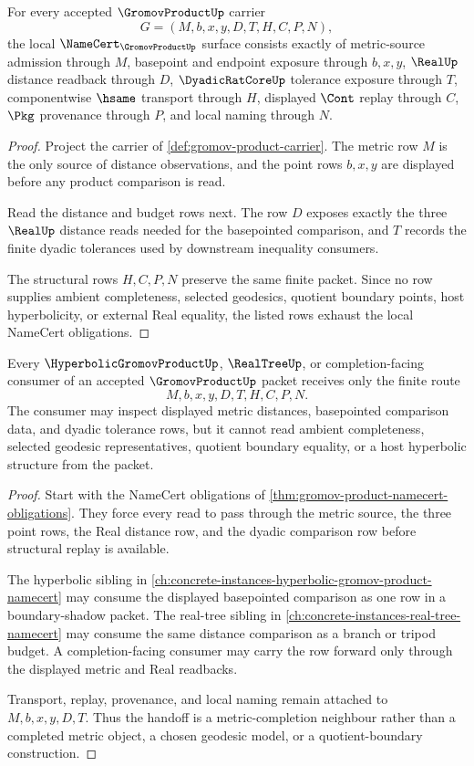\begin{theorem}
\label{thm:gromov-product-namecert-obligations}
For every accepted $\GromovProductUp$ carrier
$$
G=(M,b,x,y,D,T,H,C,P,N),
$$
the local $\NameCert_{\GromovProductUp}$ surface consists exactly of metric-source admission through $M$, basepoint and endpoint exposure through $b,x,y$, $\RealUp$ distance readback through $D$, $\DyadicRatCoreUp$ tolerance exposure through $T$, componentwise $\hsame$ transport through $H$, displayed $\Cont$ replay through $C$, $\Pkg$ provenance through $P$, and local naming through $N$.
\end{theorem}
\begin{proof}
Project the carrier of \autoref{def:gromov-product-carrier}. The metric row $M$ is the only source of distance observations, and the point rows $b,x,y$ are displayed before any product comparison is read.

Read the distance and budget rows next. The row $D$ exposes exactly the three $\RealUp$ distance reads needed for the basepointed comparison, and $T$ records the finite dyadic tolerances used by downstream inequality consumers.

The structural rows $H,C,P,N$ preserve the same finite packet. Since no row supplies ambient completeness, selected geodesics, quotient boundary points, host hyperbolicity, or external Real equality, the listed rows exhaust the local NameCert obligations.
\end{proof}

\begin{theorem}
\label{thm:gromov-product-metric-completion-handoff}
Every $\HyperbolicGromovProductUp$, $\RealTreeUp$, or completion-facing consumer of an accepted $\GromovProductUp$ packet receives only the finite route
$$
M,b,x,y,D,T,H,C,P,N .
$$
The consumer may inspect displayed metric distances, basepointed comparison data, and dyadic tolerance rows, but it cannot read ambient completeness, selected geodesic representatives, quotient boundary equality, or a host hyperbolic structure from the packet.
\end{theorem}
\begin{proof}
Start with the NameCert obligations of \autoref{thm:gromov-product-namecert-obligations}. They force every read to pass through the metric source, the three point rows, the Real distance row, and the dyadic comparison row before structural replay is available.

The hyperbolic sibling in \autoref{ch:concrete-instances-hyperbolic-gromov-product-namecert} may consume the displayed basepointed comparison as one row in a boundary-shadow packet. The real-tree sibling in \autoref{ch:concrete-instances-real-tree-namecert} may consume the same distance comparison as a branch or tripod budget. A completion-facing consumer may carry the row forward only through the displayed metric and Real readbacks.

Transport, replay, provenance, and local naming remain attached to $M,b,x,y,D,T$. Thus the handoff is a metric-completion neighbour rather than a completed metric object, a chosen geodesic model, or a quotient-boundary construction.
\end{proof}

